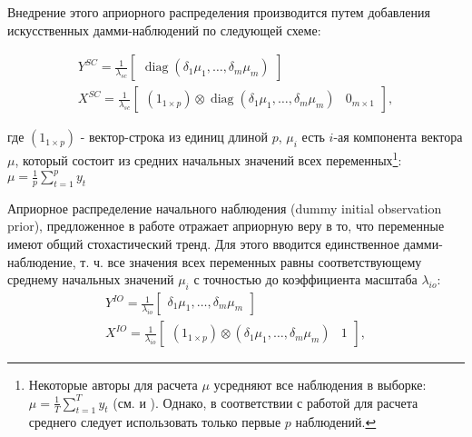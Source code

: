 \documentclass[11pt]{article} %
\DeclareMathOperator{\diag}{diag}
\newcommand{\post}{\overline}
\begin{document}
Внедрение этого априорного распределения производится путем добавления искусственных дамми-наблюдений по следующей схеме:


\begin{gather}
Y^{SC}=\frac{1}{\lambda_{sc}}\begin{bmatrix}\diag(\delta_1\mu_1,\ldots,\delta_m\mu_m)\end{bmatrix}\\
X^{SC}=\frac{1}{\lambda_{sc}}\begin{bmatrix}(1_{1\times p})\otimes \diag(\delta_1\mu_1,\ldots,\delta_m\mu_m) &0_{m\times 1}\end{bmatrix},
\end{gather}

где $(1_{1\times p})$ - вектор-строка из единиц длиной $p$, $\mu_i$ есть $i$-ая компонента вектора $\mu$, который состоит из средних начальных значений всех переменных\footnote{Некоторые авторы для  расчета $\mu$ усредняют все наблюдения в выборке: $\mu=\frac{1}{T}\sum_{t=1}^T y_t$ (см. \cite{banbura_al_2010} и \cite{carriero_al_2015}). Однако, в соответствии с работой \cite{sims_zha_1998} для расчета среднего следует использовать только первые $p$ наблюдений.}: $\mu=\frac{1}{p}\sum_{t=1}^p y_t$

Априорное распределение начального наблюдения (dummy initial observation prior), предложенное в работе \cite{sims_1993} отражает априорную веру в то, что переменные имеют общий стохастический тренд. Для этого вводится единственное дамми-наблюдение, т. ч. все значения всех переменных равны соответствующему среднему начальных значений $\mu_i$ с точностью до коэффициента масштаба $\lambda_{io}$:
\begin{gather}
Y^{IO}=\frac{1}{\lambda_{io}}\begin{bmatrix}
\delta_1\mu_1,\ldots,\delta_m\mu_m
\end{bmatrix}\\
X^{IO}=\frac{1}{\lambda_{io}}\begin{bmatrix}
(1_{1\times p})\otimes (\delta_1\mu_1,\ldots,\delta_m\mu_m) &1
\end{bmatrix},
\end{gather}
\end{document}
